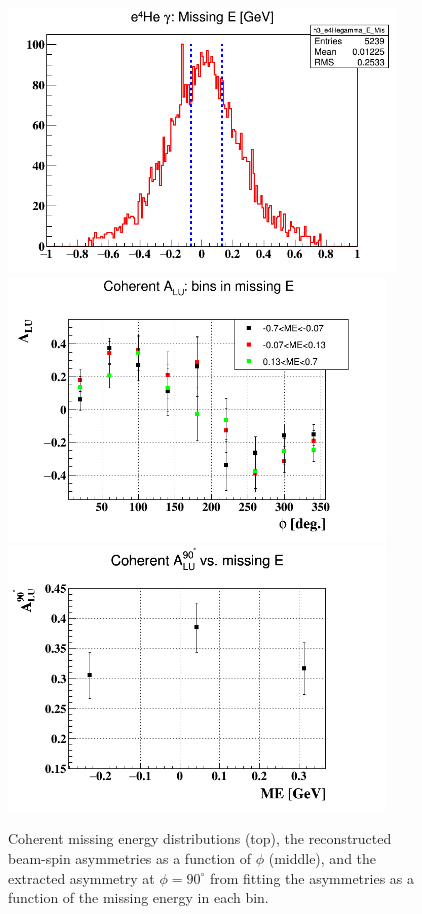 \begin{enumerate}
\begin{enumerate}
\begin{figure}[tbp]
   \centering
   \includegraphics[height=7.0cm]{fig/coh_ME_bins.png}
   \includegraphics[height=7.0cm]{fig/BSA_coherent_ME.png}
   \includegraphics[height=7.0cm]{fig/coh_ME_alpha.png}
   \caption{Coherent missing energy distributions (top), the reconstructed 
   beam-spin asymmetries as a function of $\phi$ (middle), and the extracted 
asymmetry at $\phi = 90 ^{\circ}$ from fitting the asymmetries as a function of 
the missing energy in each bin. }
   \label{fig:coherent_ME_bins}
    \end{figure}



\end{enumerate}
\end{enumerate}
